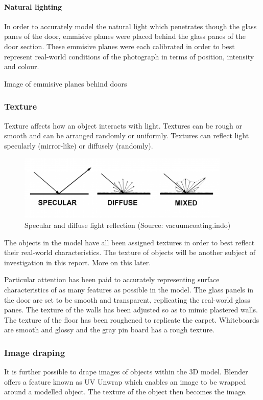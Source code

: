 \documentclass[11pt,a4paper]{report}
\begin{document}
				\paragraph{Natural lighting}
					In order to accurately model the natural light which penetrates though the glass panes of the door, emmisive planes were placed behind the glass panes of the door section. These emmisive planes were each calibrated in order to best represent real-world conditions of the photograph in terms of position, intensity and colour.
					
					{{Image of emmisive planes behind doors}}
			\subsubsection{Texture}
				Texture affects how an object interacts with light. Textures can be rough or smooth and can be arranged randomly or uniformly. Textures can reflect light specularly (mirror-like) or diffusely (randomly).
				
				\begin{figure}[H]
					\centering
					\includegraphics[width=0.9\textwidth]{light_reflection}
					\caption[Reflection]{Specular and diffuse light reflection (Source: vacuumcoating.indo)}
					\label{fig:light_reflection}
				\end{figure}
				The objects in the model have all been assigned textures in order to best reflect their real-world characteristics. The texture of objects will be another subject of investigation in this report. More on this later.
				
				Particular attention has been paid to accurately representing surface characteristics of as many features as possible in the model. The glass panels in the door are set to be smooth and transparent, replicating the real-world glass panes. The texture of the walls has been adjusted so as to mimic plastered walls. The texture of the floor has been roughened to replicate the carpet. Whiteboards are smooth and glossy and the gray pin board has a rough texture.
				
			\subsubsection{Image draping}
				It is further possible to drape images of objects within the 3D model. Blender offers a feature known as UV Unwrap which enables an image to be wrapped around a modelled object. The texture of the object then becomes the image.
				
\end{document}
